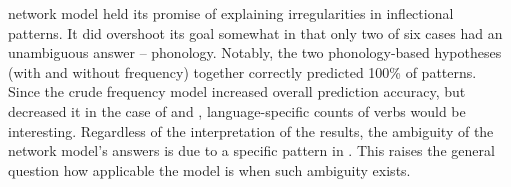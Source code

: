 
 network model held its promise of explaining irregularities in inflectional patterns.
It  did overshoot its goal somewhat in that only two of six cases had an unambiguous answer -- phonology.
Notably, the two phonology-based hypotheses (with and without frequency) together correctly predicted 100\% of patterns.
Since the crude frequency model increased overall prediction accuracy, but decreased it in the case of \carijo and \yukpa, language-specific counts of  verbs would be interesting.
Regardless of the interpretation of the results, the ambiguity of the network model's answers is due to a specific pattern in \PC.
This raises the general question how applicable the model is when such ambiguity exists.

%
%

